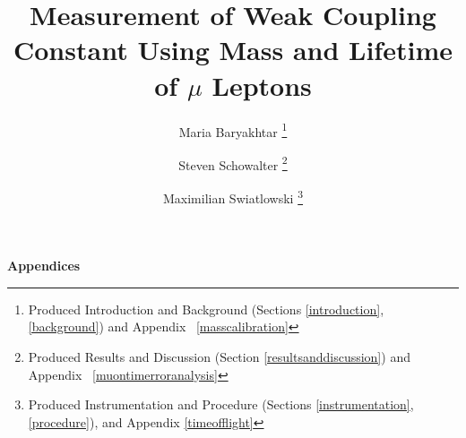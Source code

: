 \documentclass[psfig,12pt,notitlepage]{article}
\begin{document}
\title{Measurement of Weak Coupling Constant Using Mass and Lifetime
of $\mu$ Leptons} \author{Maria Baryakhtar \footnote{Produced
Introduction and Background (Sections \ref{introduction},
\ref{background}) and Appendix ~\ref{masscalibration}} \and Steven
Schowalter \footnote{Produced Results and Discussion (Section
\ref{resultsanddiscussion}) and Appendix ~\ref{muontimerroranalysis}}
\and Maximilian Swiatlowski
\footnote{Produced Instrumentation and Procedure (Sections
\ref{instrumentation}, \ref{procedure}), and Appendix
\ref{timeofflight}}}

\maketitle



\clearpage
\tableofcontents
\setcounter{tocdepth}{2}


\clearpage












\newpage

\appendix

\begin{center}
\begin{Large}
\bfseries{Appendices}
\end{Large}
\end{center}







\end{document}
